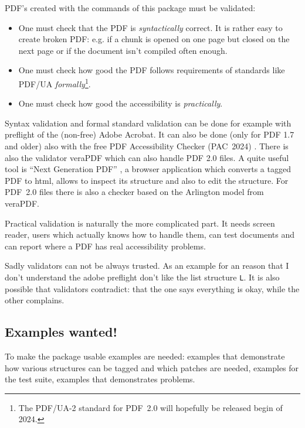 \documentclass[bibliography=totoc,a4paper]{article}
\newcommand\PDF{PDF}
\begin{document}
\PDF{}'s created with the commands of this package must be validated:

\begin{itemize}
\item
 One must check that the \PDF{} is \emph{syntactically} correct. 
 It is rather easy to create broken \PDF{}:
 e.g. if a chunk is opened on one page but closed 
 on the next page or if the document isn't compiled often enough.

\item One must check how good the PDF follows requirements of standards 
    like PDF/UA \emph{formally}\footnote{The PDF/UA-2 standard for \PDF~2.0 
    will hopefully be released begin of 2024.}. 

\item
One must check how good the accessibility is \emph{practically}.
\end{itemize}


Syntax validation and formal standard validation can be done for example with 
preflight of the (non-free) Adobe Acrobat. It can also be done 
(only for PDF 1.7 and older) also with the 
free \PDF{} Accessibility Checker (PAC~2024) \parencite{pac2024}. There is also 
the validator veraPDF \parencite{verapdf} which can also handle PDF 2.0 files. 
A quite useful tool 
is \enquote{Next Generation PDF} \parencite{ngpdf}, a browser application 
which converts a tagged PDF to html, allows to inspect its structure and also 
to edit the structure. For PDF~2.0 files there is also a checker based on the 
Arlington model from veraPDF. 

Practical validation is naturally the more complicated part. 
It needs screen reader, users which actually knows how to handle them, 
can test documents and can report where a \PDF{} has real accessibility problems.



Sadly validators can not be always trusted. 
As an example for an reason that I don't understand the adobe preflight 
don't like the list structure \texttt{L}.
It is also possible that validators contradict: that the one says everything is okay, 
while the other complains.

\subsection{Examples wanted!}

To make the package usable examples are needed: examples that demonstrate how 
various structures can be tagged and which patches are needed, examples for 
the test suite, examples that demonstrates problems. 
\end{document}
